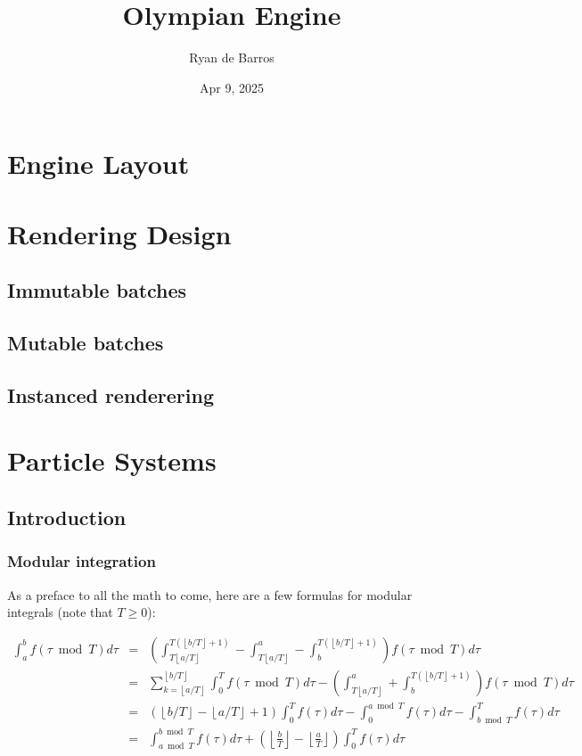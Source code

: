 \documentclass[10pt]{report}
\newcommand{\floor}[1]{\left\lfloor #1 \right\rfloor}
\begin{document}
\title{Olympian Engine}
\author{Ryan de Barros}
\date{Apr 9, 2025}
\maketitle

\tableofcontents

\chapter{Engine Layout}


\chapter{Rendering Design}

\section{Immutable batches}

\section{Mutable batches}

\section{Instanced renderering}


\chapter{Particle Systems}

\section{Introduction}

\subsection{Modular integration}
As a preface to all the math to come, here are a few formulas for modular integrals (note that $T\geq0$):

\begin{eqnarray}
\int_a^bf(\tau\bmod T)d\tau&=&\left(\int_{T\floor{a/T}}^{T(\floor{b/T}+1)}-\int_{T\floor{a/T}}^a-\int_b^{T(\floor{b/T}+1)}\right)f(\tau\bmod T)d\tau\\
&=&\sum_{k=\floor{a/T}}^{\floor{b/T}}\int_0^Tf(\tau\bmod T)d\tau-\left(\int_{T\floor{a/T}}^a+\int_b^{T(\floor{b/T}+1)}\right)f(\tau\bmod T)d\tau\\
&=&(\floor{b/T}-\floor{a/T}+1)\int_0^Tf(\tau)d\tau-\int_0^{a\bmod T}f(\tau)d\tau-\int_{b\bmod T}^Tf(\tau)d\tau\\
&=&\int_{a\bmod T}^{b\bmod T}f(\tau)d\tau+(\floor{\tfrac{b}{T}}-\floor{\tfrac{a}{T}})\int_0^Tf(\tau)d\tau
\end{eqnarray}
\end{document}
